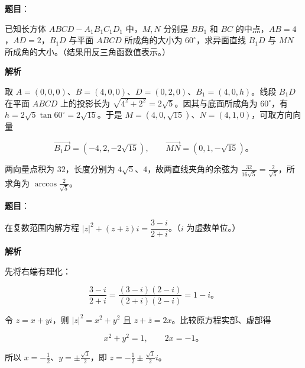 \begin{answer}

\textbf{题目}：

已知长方体 $ABCD-A_1B_1C_1D_1$ 中，$M,N$ 分别是 $BB_1$ 和 $BC$ 的中点，$AB=4$，$AD=2$，$B_1D$ 与平面 $ABCD$ 所成角的大小为 $60^\circ$，求异面直线 $B_1D$ 与 $MN$ 所成角的大小。（结果用反三角函数值表示。）
\nopagebreak[4]
\begin{center}\end{center}
\nopagebreak[4]
\textbf{解析}

取 $A=(0,0,0)$、$B=(4,0,0)$、$D=(0,2,0)$、$B_1=(4,0,h)$。线段 $B_1D$ 在平面 $ABCD$ 上的投影长为 $\sqrt{4^2+2^2}=2\sqrt5$。因其与底面所成角为 $60^\circ$，有 $h=2\sqrt5\tan60^\circ=2\sqrt{15}$。于是 $M=(4,0,\sqrt{15})$、$N=(4,1,0)$，可取方向向量

\nopagebreak[4]
\[
\vec{B_1D}=(-4,2,-2\sqrt{15}),\qquad \vec{MN}=(0,1,-\sqrt{15})\mbox{。}
\]

两向量点积为 $32$，长度分别为 $4\sqrt5$、$4$，故两直线夹角的余弦为 $\frac{32}{16\sqrt5}=\frac2{\sqrt5}$，所求角为 $\arccos\frac2{\sqrt5}$。


\end{answer}
\begin{answer}

\textbf{题目}：

在复数范围内解方程 $|z|^2+(z+\overline z)i=\dfrac{3-i}{2+i}$。（$i$ 为虚数单位。）

\textbf{解析}

先将右端有理化：

\nopagebreak[4]
\[
\frac{3-i}{2+i}=\frac{(3-i)(2-i)}{(2+i)(2-i)}=1-i\mbox{。}
\]

令 $z=x+yi$，则 $|z|^2=x^2+y^2$ 且 $z+\overline z=2x$。比较原方程实部、虚部得

\nopagebreak[4]
\[
x^2+y^2=1,\qquad 2x=-1\mbox{。}
\]

所以 $x=-\frac12$、$y=\pm\frac{\sqrt3}{2}$，即 $z=-\frac12\pm\frac{\sqrt3}{2}i$。


\end{answer}
